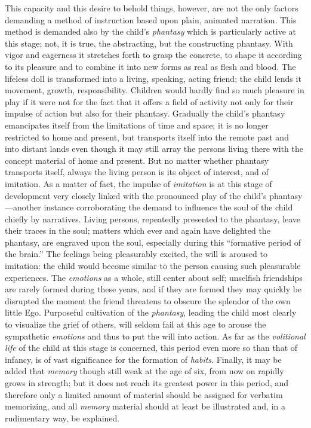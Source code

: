 This capacity and this desire to behold things, however, are not the only factors demanding a method of instruction based upon plain, animated narration. This method is demanded also by the child’s \emph{phantasy} which is particularly active at this stage; not, it is true, the abstracting, but the constructing phantasy. With vigor and eagerness it stretches forth to grasp the concrete, to shape it according to its pleasure and to combine it into new forms as real as flesh and blood. The lifeless doll is transformed into a living, speaking, acting friend; the child lends it movement, growth, responsibility. Children would hardly find so much pleasure in play if it were not for the fact that it offers a field of activity not only for their impulse of action but also for their phantasy. Gradually the child’s phantasy emancipates itself from the limitations of time and space; it is no longer restricted to home and present, but transports itself into the remote past and into distant lands even though it may still array the persons living there with the concept material of home and present. But no matter whether phantasy transports itself, always the living person is its object of interest, and of imitation. As a matter of fact, the impulse of \emph{imitation} is at this stage of development very closely linked with the pronounced play of the child’s phantasy—another instance corroborating the demand to influence the soul of the child chiefly by narratives. Living persons, repeatedly presented to the phantasy, leave their traces in the soul; matters which ever and again have delighted the phantasy, are engraved upon the soul, especially during this “formative period of the brain.” The feelings being pleasurably excited, the will is aroused to imitation: the child would become similar to the person causing such pleasurable experiences.
The \emph{emotions} as a whole, still center about self; unselfish friendships are rarely formed during these years, and if they are formed they may quickly be disrupted the moment the friend threatens to obscure the splendor of the own little Ego. Purposeful cultivation of the \emph{phantasy}, leading the child most clearly to visualize the grief of others, will seldom fail at this age to arouse the sympathetic \emph{emotions} and thus to put the will into action. As far as the \emph{volitional life} of the child at this stage is concerned, this period even more so than that of infancy, is of vast significance for the formation of \emph{habits}. Finally, it may be added that \emph{memory} though still weak at the age of six, from now on rapidly grows in strength; but it does not reach its greatest power in this period, and therefore only a limited amount of material should be assigned for verbatim memorizing, and all \emph{memory} material should at least be illustrated and, in a rudimentary way, be explained.

